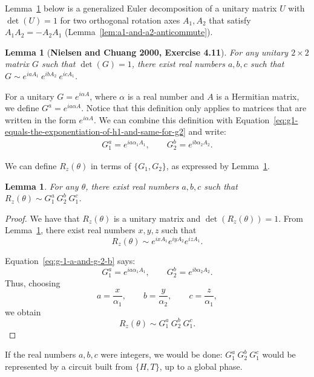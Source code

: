 \documentclass[11pt]{article}
\newtheorem{lemma}[theorem]{Lemma}
\begin{document}
Lemma~\ref{lem:generalized-euler-decomposition} below is 
a generalized Euler decomposition of a unitary matrix $U$
with $\det(U) = 1$ for two orthogonal rotation axes $A_1,A_2$
that satisfy $A_1 A_2 = - A_2 A_1$
(Lemma~\ref{lem:a1-and-a2-anticommute}).

\begin{lemma}[{\bf Nielsen and Chuang 2000, Exercise 4.11}]
\label{lem:generalized-euler-decomposition}
For any unitary $2 \times 2$ matrix $G$ such that $\det(G) = 1$,
there exist real numbers $a,b,c$ such that
$G \sim e^{iaA_1}\ e^{ibA_2}\ e^{icA_1}$.
\end{lemma}

For a unitary $G = e^{i\alpha A}$, where 
$\alpha$ is a real number and
$A$ is a Hermitian matrix,
we define $G^a = e^{i a\alpha A}$.
Notice that this definition only applies to matrices that are written in 
the form $e^{i \alpha A}$.
We can combine this definition with
Equation~\ref{eq:g1-equals-the-exponentiation-of-h1-and-same-for-g2} and write:
\begin{eqnarray}
G_1^a = e^{ia\alpha_1A_1},
\qquad
G_2^b = e^{ib\alpha_2A_2}.
\label{eq:g-1-a-and-g-2-b}
\end{eqnarray}

We can define $R_z(\theta)$ 
in terms of $\{G_1,G_2\}$, as expressed by Lemma~\ref{lem:from-rz-to-g1-g2}.

\begin{lemma}
\label{lem:from-rz-to-g1-g2}
For any $\theta$, there exist real numbers $a, b, c$ such that
$R_z(\theta) \sim G_1^a\ G_2^b\ G_1^c$.
\end{lemma}

\begin{proof}
We have that $R_z(\theta)$ is a unitary matrix and $\det(R_z(\theta)) = 1$. 
From Lemma~\ref{lem:generalized-euler-decomposition}, there exist real numbers
$x,y,z$ such that
\[
R_z(\theta)
\sim
e^{ixA_1}e^{iyA_2}e^{izA_1}.
\]

Equation~\ref{eq:g-1-a-and-g-2-b} says:
\[
G_1^a = e^{ia\alpha_1A_1},
\qquad
G_2^b = e^{ib\alpha_2A_2}.
\]
Thus, choosing
\[
a=\frac{x}{\alpha_1},
\qquad
b=\frac{y}{\alpha_2},
\qquad
c=\frac{z}{\alpha_1},
\]
we obtain
\[
R_z(\theta) 
\sim 
G_1^a\ G_2^b\ G_1^c.
\]
\end{proof}

If the real numbers $a,b,c$ were integers, we would be done:
$G_1^a\ G_2^b\ G_1^c$ would be represented by a circuit built from $\{H,T\}$, 
up to a global phase.
\end{document}
